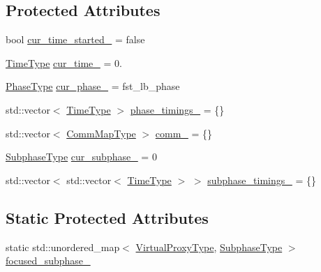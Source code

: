 \subsection*{Protected Attributes}
\begin{DoxyCompactItemize}
\item 
bool \hyperlink{structvt_1_1vrt_1_1collection_1_1balance_1_1_element_stats_a4fa029e81c6907ace700b8c3df10457f}{cur\+\_\+time\+\_\+started\+\_\+} = false
\item 
\hyperlink{namespacevt_a876a9d0cd5a952859c72de8a46881442}{Time\+Type} \hyperlink{structvt_1_1vrt_1_1collection_1_1balance_1_1_element_stats_ab0538c11d7a658e43f80c48023f7b8c6}{cur\+\_\+time\+\_\+} = 0.
\item 
\hyperlink{structvt_1_1vrt_1_1collection_1_1balance_1_1_element_stats_a6edee983bb2ae96a341763520af33c66}{Phase\+Type} \hyperlink{structvt_1_1vrt_1_1collection_1_1balance_1_1_element_stats_a661531ffc78883018a8e553179f9324d}{cur\+\_\+phase\+\_\+} = fst\+\_\+lb\+\_\+phase
\item 
std\+::vector$<$ \hyperlink{namespacevt_a876a9d0cd5a952859c72de8a46881442}{Time\+Type} $>$ \hyperlink{structvt_1_1vrt_1_1collection_1_1balance_1_1_element_stats_ac3df7cd0b637aef1e0faa92bb0193542}{phase\+\_\+timings\+\_\+} = \{\}
\item 
std\+::vector$<$ \hyperlink{namespacevt_1_1vrt_1_1collection_1_1balance_aa50d4cbbfa3c643e7303fc6e08f411fb}{Comm\+Map\+Type} $>$ \hyperlink{structvt_1_1vrt_1_1collection_1_1balance_1_1_element_stats_a1673ce54a075060ea7e04c6e300b9682}{comm\+\_\+} = \{\}
\item 
\hyperlink{structvt_1_1vrt_1_1collection_1_1balance_1_1_element_stats_af9ec1f2527b6569a003579f7950db71e}{Subphase\+Type} \hyperlink{structvt_1_1vrt_1_1collection_1_1balance_1_1_element_stats_a1a8a5e855950900f0f1b470ff5f6071b}{cur\+\_\+subphase\+\_\+} = 0
\item 
std\+::vector$<$ std\+::vector$<$ \hyperlink{namespacevt_a876a9d0cd5a952859c72de8a46881442}{Time\+Type} $>$ $>$ \hyperlink{structvt_1_1vrt_1_1collection_1_1balance_1_1_element_stats_a27ee2ef1979d4e4e9e4ca34fa8e88591}{subphase\+\_\+timings\+\_\+} = \{\}
\end{DoxyCompactItemize}
\subsection*{Static Protected Attributes}
\begin{DoxyCompactItemize}
\item 
static std\+::unordered\+\_\+map$<$ \hyperlink{namespacevt_a1b417dd5d684f045bb58a0ede70045ac}{Virtual\+Proxy\+Type}, \hyperlink{structvt_1_1vrt_1_1collection_1_1balance_1_1_element_stats_af9ec1f2527b6569a003579f7950db71e}{Subphase\+Type} $>$ \hyperlink{structvt_1_1vrt_1_1collection_1_1balance_1_1_element_stats_adcb9398a6c5bc0b5f66a55d23694743c}{focused\+\_\+subphase\+\_\+}
\end{DoxyCompactItemize}

